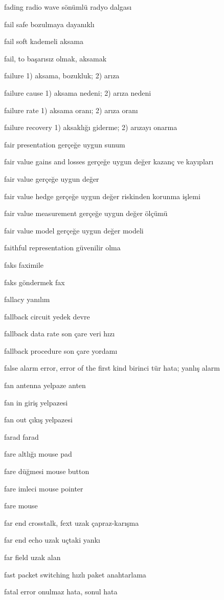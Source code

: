 \documentclass[12pt,fleqn]{article}\usepackage{../../common}
\begin{document}
fading radio wave sönümlü radyo dalgası

fail safe bozulmaya dayanıklı

fail soft kademeli aksama

fail, to başarısız olmak, aksamak

failure 1) aksama, bozukluk; 2) arıza

failure cause 1) aksama nedeni; 2) arıza nedeni

failure rate 1) aksama oranı; 2) arıza oranı

failure recovery 1) aksaklığı giderme; 2) arızayı onarma

fair presentation gerçeğe uygun sunum

fair value gains and losses gerçeğe uygun değer kazanç ve kayıpları

fair value gerçeğe uygun değer

fair value hedge gerçeğe uygun değer riskinden korunma işlemi

fair value measurement gerçeğe uygun değer ölçümü

fair value model gerçeğe uygun değer modeli

faithful representation güvenilir olma

faks faximile

faks göndermek fax

fallacy yanılım

fallback circuit yedek devre

fallback data rate son çare veri hızı

fallback procedure son çare yordamı

false alarm error, error of the first kind birinci tür hata; yanlış alarm

fan antenna yelpaze anten

fan in giriş yelpazesi

fan out çıkış yelpazesi

farad farad

fare altlığı mouse pad

fare düğmesi mouse button

fare imleci mouse pointer

fare mouse

far end crosstalk, fext uzak çapraz-karışma

far end echo uzak uçtaki yankı

far field uzak alan

fast packet switching hızlı paket anahtarlama

fatal error onulmaz hata, sonul hata
\end{document}
